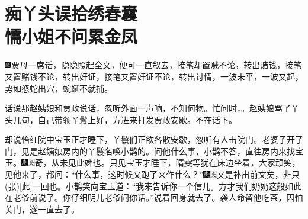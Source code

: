 \chapter{痴丫头误拾绣春囊\\懦小姐不问累金凤}
{\includegraphics[width=3mm]{../Images/00005}\kaishu 贾母一席话，隐隐照起全文，便可一直叙去，接笔却置贼不论，转出赌钱，接笔又置赌钱不论，转出奸证，接笔又置奸证不论，转出讨情，一波未平，一波又起，势如怒蛇出穴，蜿蜒不就捕。}

话说那赵姨娘和贾政说话，忽听外面一声响，不知何物。忙问时，。赵姨娘骂了丫头几句，自己带领丫鬟上好，方进来打发贾政安歇。不在话下。

却说怡红院中宝玉正才睡下，丫鬟们正欲各散安歇，忽听有人击院门。老婆子开了门，见是赵姨娘房内的丫鬟名唤小鹊的。问他什么事，小鹊不答，直往房内来找宝玉。{\includegraphics[width=3mm]{../Images/00004}\includegraphics[width=3mm]{../Images/00012}\footnotesize \kaishu 奇，从未见此婢也。}只见宝玉才睡下，晴雯等犹在床边坐着，大家顽笑，见他来了，都问：``什么事，这时候又跑了来作什么？''{\includegraphics[width=3mm]{../Images/00004}\includegraphics[width=3mm]{../Images/00012}\footnotesize \kaishu 又是补出前文矣，非只{(张)}{[}此{]}一回也。}小鹊笑向宝玉道：``我来告诉你一个信儿。方才我们奶奶这般如此在老爷前说了。你仔细明儿老爷问你话。''说着回身就去了。袭人命留他吃茶，因怕关门，遂一直去了。


